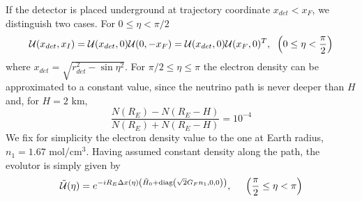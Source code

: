 \documentclass{article}
\begin{document}
If the detector is placed underground at trajectory coordinate $x_{det} < x_F$, we distinguish two cases. For $0 \leq \eta < \pi/2$
\begin{equation}
	\mathcal{U}(x_{det},x_I) = \mathcal{U}(x_{det}, 0) \mathcal{U}(0, - x_F) = \mathcal{U}(x_{det}, 0) \mathcal{U}(x_F, 0)^T, \hspace{0.2cm} \left(0 \leq \eta < \frac{\pi}{2} \right)
\end{equation}
where $x_{det} = \sqrt{r_{det}^2 - \sin\eta^2}$. For $\pi/2 \leq \eta \leq \pi$ the electron density can be approximated to a constant value, since the neutrino path is never deeper than $H$ and, for $H = 2$ km,
\begin{equation}
	\frac{N(R_E) - N(R_E-H)}{N(R_E) + N(R_E - H)} = 10^{-4}
\end{equation}
We fix for simplicity the electron density value to the one at Earth radius, $n_1 = 1.67$ mol/cm${^3}$. Having assumed constant density along the path, the evolutor is simply given by
\begin{equation}
	\tilde{\mathcal{U}}(\eta) = e^{-i R_E \Delta x(\eta) \left(\tilde{H}_0 + \text{diag}\left(\sqrt{2}G_F n_1, 0, 0\right) \right)}, \hspace{0.5cm} \left(\frac{\pi}{2} \leq \eta < \pi \right)
\end{equation}



\end{document}

